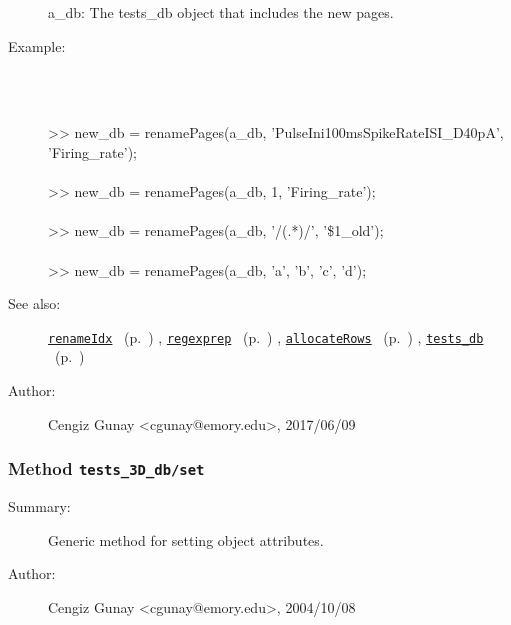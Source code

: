 \begin{description}
   a\_db: The tests\_db object that includes the new pages.
%
\item[Example:]~
\begin{lyxcode} %
\\%
 >> new\_db = renamePages(a\_db, 'PulseIni100msSpikeRateISI\_D40pA', 'Firing\_rate');
\\%
\\%
 >> new\_db = renamePages(a\_db, 1, 'Firing\_rate');
\\%
\\%
 >> new\_db = renamePages(a\_db, '/(.*)/', '\$1\_old');
\\%
\\%
 >> new\_db = renamePages(a\_db, {'a', 'b'}, {'c', 'd'});
\\%
\end{lyxcode}
%
\item[See also:]%
\hyperlink{ref_renameIdx}{\texttt{renameIdx}}%
\ (p.~\pageref{ref_renameIdx})%
%
, \hyperlink{ref_regexprep}{\texttt{regexprep}}%
\ (p.~\pageref{ref_regexprep})%
%
, \hyperlink{ref_allocateRows}{\texttt{allocateRows}}%
\ (p.~\pageref{ref_allocateRows})%
%
, \hyperlink{ref_tests_db}{\texttt{tests\_db}}%
\ (p.~\pageref{ref_tests_db})%
%
%
\item[Author:]%
Cengiz Gunay <cgunay@emory.edu>, 2017/06/09
%
\end{description}
\methodline%
\subsubsection[Method \texttt{set}]{Method \texttt{tests\_3D\_db/set}}%
%
\label{ref_tests_3D_db__set}%
\hypertarget{ref_tests_3D_db__set}{}%
\begin{description}
\item[Summary:]Generic method for setting object attributes.
%
%
%
%
%
%
%
\item[Author:]%
Cengiz Gunay <cgunay@emory.edu>, 2004/10/08
%
\end{description}
\methodline%
